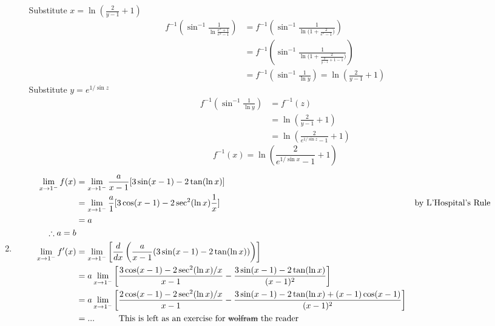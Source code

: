 \documentclass[12pt]{article}
\theoremstyle{definition}
\begin{document}
\begin{enumerate}
\begin{enumerate}
                Substitute $x=\ln(\frac{2}{y-1}+1)$
                \begin{align*}
                  f^{-1}(\sin^{-1}\frac{1}{\ln{\frac{e^x+1}{e^x-1}}})
                    & =f^{-1}(\sin^{-1}\frac{1}{\ln{(1+\frac{2}{e^x-1}})})             \\
                    & =f^{-1}(\sin^{-1}\frac{1}{\ln{(1+\frac{2}{\frac{2}{y-1}+1-1}})}) \\
                    & =f^{-1}(\sin^{-1}\frac{1}{\ln y}) = \ln(\frac{2}{y-1}+1)
                \end{align*}
                Substitute $y=e^{1/\sin{z}}$
                \begin{align*}
                  f^{-1}(\sin^{-1}\frac{1}{\ln y})
                    & =f^{-1}(z)                        \\
                    & =\ln(\frac{2}{y-1}+1)             \\
                    & =\ln(\frac{2}{e^{1/\sin{z}}-1}+1)
                \end{align*}
                \begin{equation*}
                  f^{-1}(x)=\ln(\frac{2}{e^{1/\sin{x}}-1}+1)
                \end{equation*}
        \end{enumerate}
  \item
        \begin{align*}
          \lim_{x\to 1^{-}} f(x) &= \lim_{x\to 1^{-}} \frac{a}{x-1}[3\sin(x-1)-2\tan(\ln x)]\\
            & =\lim_{x\to 1^{-}} \frac{a}{1}[3\cos(x-1)-2\sec^2(\ln x)\frac{1}{x}] &   & \text{by L'Hospital's Rule} \\
          &=a\\
          \therefore a=b \\
          \lim_{x\to 1^{-}} f'(x) &= \lim_{x\to 1^{-}} \left[\frac{d}{dx}\left(\frac{a}{x-1}(3\sin(x-1)-2\tan(\ln x)) \right)\right] \\
          &= a \lim_{x\to 1^{-}} \left[\frac{3\cos(x-1)-2\sec^2(\ln x)/x}{x-1} - \frac{3\sin(x-1) - 2\tan(\ln x)}{(x-1)^2} \right] \\
          &= a \lim_{x\to 1^{-}} \left[\frac{2\cos(x-1)-2\sec^2(\ln x)/x}{x-1} - \frac{3\sin(x-1) - 2\tan(\ln x)+(x-1)\cos(x-1)}{(x-1)^2} \right] \\
          &= ... \hspace{1cm} \text{This is left as an exercise for \sout{wolfram} the reader} \\

\end{align*}
\end{enumerate}
\end{document}
